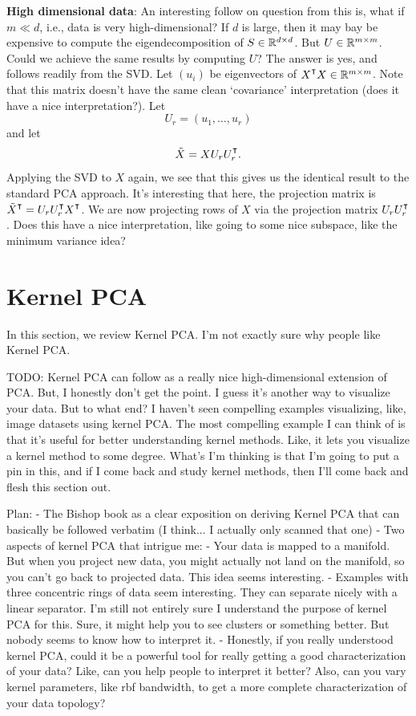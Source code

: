 \vspace{1em}
\noindent \textbf{High dimensional data}: An interesting follow on question from this is, what if $m \ll d$, i.e., data is very high-dimensional? If $d$ is large, then it may bay be expensive to compute the eigendecomposition of $S\in \mathbb{R}^{d\times d}$. But $U\in \mathbb{R}^{m\times m}$. Could we achieve the same results by computing $U$? The answer is yes, and follows readily from the SVD. Let $(u_i)$ be eigenvectors of $X^\T X\in \R^{m\times m}$. Note that this matrix doesn't have the same clean `covariance' interpretation (does it have a nice interpretation?). Let
$$
U_r = (u_1,\ldots, u_r)
$$
and let 
$$
\tilde X = XU_rU_r^\T.
$$
Applying the SVD to $X$ again, we see that this gives us the identical result to the standard PCA approach. It's interesting that here, the projection matrix is $\tilde X^\T = U_r U_r^\T X^\T$. We are now projecting rows of $X$ via the projection matrix $U_r U_r^\T$. Does this have a nice interpretation, like going to some nice subspace, like the minimum variance idea? 

\section{Kernel PCA}
In this section, we review Kernel PCA. I'm not exactly sure why people like Kernel PCA. 

TODO: Kernel PCA can follow as a really nice high-dimensional extension of PCA. But, I honestly don't get the point. I guess it's another way to visualize your data. But to what end? I haven't seen compelling examples visualizing, like, image datasets using kernel PCA. The most compelling example I can think of is that it's useful for better understanding kernel methods. Like, it lets you visualize a kernel method to some degree. What's I'm thinking is that I'm going to put a pin in this, and if I come back and study kernel methods, then I'll come back and flesh this section out. 

Plan: 
- The Bishop book as a clear exposition on deriving Kernel PCA that can basically be followed verbatim (I think... I actually only scanned that one)
- Two aspects of kernel PCA that intrigue me:
- Your data is mapped to a manifold. But when you project new data, you might actually not land on the manifold, so you can't go back to projected data. This idea seems interesting. 
- Examples with three concentric rings of data seem interesting. They can separate nicely with a linear separator. I'm still not entirely sure I understand the purpose of kernel PCA for this. Sure, it might help you to see clusters or something better. But nobody seems to know how to interpret it. 
- Honestly, if you really understood kernel PCA, could it be a powerful tool for really getting a good characterization of your data? Like, can you help people to interpret it better? Also, can you vary kernel parameters, like rbf bandwidth, to get a more complete characterization of your data topology?

%
%
